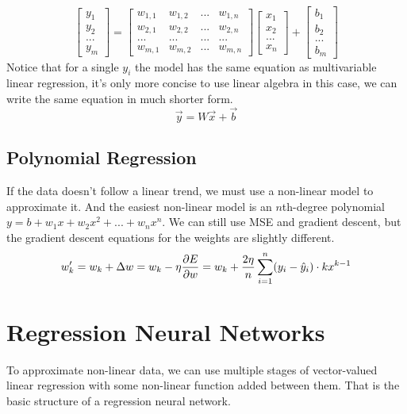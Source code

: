 \documentclass[a4paper]{article}
\theoremstyle{definition}
\begin{document}
\begin{equation*}
    \begin{bmatrix} y_1\\ y_2\\ ...\\ y_m \end{bmatrix} = \begin{bmatrix} w_{1,1} & w_{1,2} & ... & w_{1,n}\\ w_{2,1} & w_{2,2} & ... & w_{2,n}\\ ... & ... & ... & ...\\ w_{m,1} & w_{m,2} & ... & w_{m,n} \end{bmatrix} \begin{bmatrix} x_1\\ x_2\\ ...\\ x_n \end{bmatrix} + \begin{bmatrix} b_1\\ b_2\\ ...\\ b_m \end{bmatrix}
\end{equation*}
Notice that for a single $y_i$ the model has the same equation as multivariable linear regression, it's only more concise to use linear algebra in this case, we can write the same equation in much shorter form.
\begin{equation*}
    \vec{y} = W \vec{x} + \vec{b}
\end{equation*}

\subsection{Polynomial Regression}
If the data doesn't follow a linear trend, we must use a non-linear model to approximate it.
And the easiest non-linear model is an $n$th-degree polynomial $y = b + w_1x + w_2x^2 + ... + w_nx^n$.
We can still use MSE and gradient descent, but the gradient descent equations for the weights are slightly different.
\begin{equation*}
    w_k' = w_k + \Delta w = w_k -\eta \frac{\partial E}{\partial w} = w_k + \frac{2\eta}{n} \sum_{i=1}^{n} (y_i - \hat{y}_i)\cdot kx^{k-1} \\
\end{equation*}

\section{Regression Neural Networks}
To approximate non-linear data, we can use multiple stages of vector-valued linear regression with some non-linear function added between them.
That is the basic structure of a regression neural network.
\end{document}
